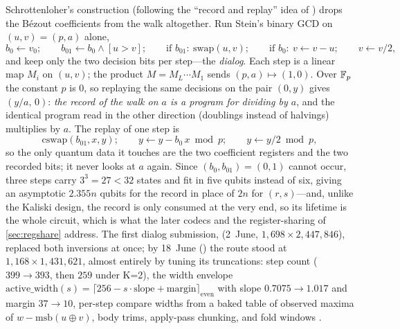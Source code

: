 Schrottenloher's construction \cite{schrottenloher26} (following the ``record and replay'' idea of \cite{khattar25}) drops the B\'ezout coefficients from the walk altogether. Run Stein's binary GCD on $(u,v)=(p,a)$ alone,
\begin{equation}\label{eq:dialog-step}
b_0\gets v_0;\qquad b_{01}\gets b_0\wedge[u>v];\qquad \text{if } b_{01}:\ \mathrm{swap}(u,v);\qquad \text{if } b_0:\ v\gets v-u;\qquad v\gets v/2 ,
\end{equation}
and keep only the two decision bits per step---the \emph{dialog}. Each step is a linear map $M_i$ on $(u,v)$; the product $M=M_L\cdots M_1$ sends $(p,a)\mapsto(1,0)$. Over $\mathbb{F}_p$ the constant $p$ is $0$, so replaying the same decisions on the pair $(0,y)$ gives $(y/a,\,0)$: \emph{the record of the walk on $a$ is a program for dividing by $a$}, and the identical program read in the other direction (doublings instead of halvings) multiplies by $a$. The replay of one step is
\[
\mathrm{cswap}(b_{01},x,y);\qquad y\gets y-b_0\,x \bmod p;\qquad y\gets y/2\bmod p ,
\]
so the only quantum data it touches are the two coefficient registers and the two recorded bits; it never looks at $a$ again. Since $(b_0,b_{01})=(0,1)$ cannot occur, three steps carry $3^3=27<32$ states and fit in five qubits instead of six, giving an asymptotic $2.355n$ qubits for the record in place of $2n$ for $(r,s)$---and, unlike the Kaliski design, the record is only consumed at the very end, so its lifetime is the whole circuit, which is what the later codecs and the register-sharing of \cref{sec:regshare} address. The first dialog submission,  (2~June, $1{,}698\times2{,}447{,}846$), replaced both inversions at once; by 18~June () the route stood at $1{,}168\times1{,}431{,}621$, almost entirely by tuning its truncations: step count ($399\to393$, then $259$ under K=2), the width envelope $\mathrm{active\_width}(s)=\lceil 256-s\cdot\mathrm{slope}+\mathrm{margin}\rceil_{\mathrm{even}}$ with slope $0.7075\to1.017$ and margin $37\to10$, per-step compare widths from a baked table of observed maxima of $w-\mathrm{msb}(u\oplus v)$, body trims, apply-pass chunking, and fold windows \cite{ecdsafail-wiki}.

